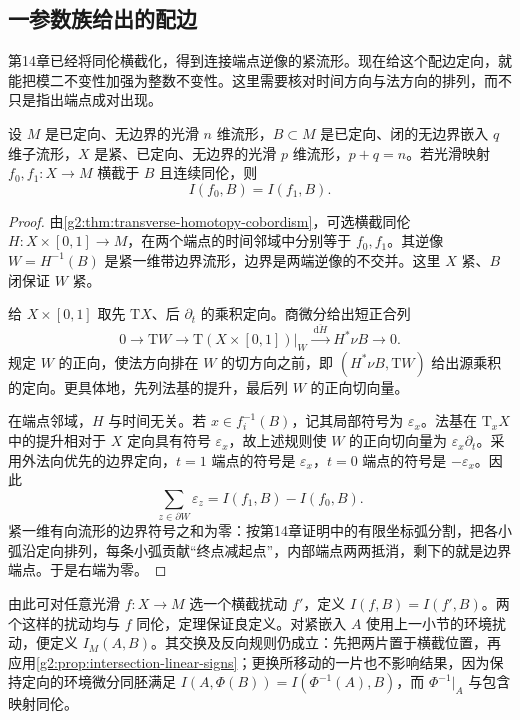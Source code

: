 \subsection{一参数族给出的配边}
\label{g2:subsec:1602:03}

第14章已经将同伦横截化，得到连接端点逆像的紧流形。现在给这个配边定向，就能把模二不变性加强为整数不变性。这里需要核对时间方向与法方向的排列，而不只是指出端点成对出现。

\begin{theorem}\label{g2:thm:intersection-homotopy-invariance}
	设 \(M\) 是已定向、无边界的光滑 \(n\) 维流形，\(B\subset M\) 是已定向、闭的无边界嵌入 \(q\) 维子流形，\(X\) 是紧、已定向、无边界的光滑 \(p\) 维流形，\(p+q=n\)。若光滑映射 \(f_0,f_1:X\to M\) 横截于 \(B\) 且连续同伦，则
	\[
		I(f_0,B)=I(f_1,B).
	\]
\end{theorem}
\begin{proof}
	由\cref{g2:thm:transverse-homotopy-cobordism}，可选横截同伦 \(H:X\times[0,1]\to M\)，在两个端点的时间邻域中分别等于 \(f_0,f_1\)。其逆像 \(W=H^{-1}(B)\) 是紧一维带边界流形，边界是两端逆像的不交并。这里 \(X\) 紧、\(B\) 闭保证 \(W\) 紧。

	给 \(X\times[0,1]\) 取先 \(\mathrm{T}X\)、后 \(\partial_t\) 的乘积定向。商微分给出短正合列
	\[
		0\longrightarrow\mathrm{T}W\longrightarrow\mathrm{T}(X\times[0,1])|_W
		\xrightarrow{\ \overline{\mathrm{d}H}\ }H^*\nu B\longrightarrow0.
	\]
	规定 \(W\) 的正向，使法方向排在 \(W\) 的切方向之前，即 \((H^*\nu B,\mathrm{T}W)\) 给出源乘积的定向。更具体地，先列法基的提升，最后列 \(W\) 的正向切向量。

	在端点邻域，\(H\) 与时间无关。若 \(x\in f_i^{-1}(B)\)，记其局部符号为 \(\varepsilon_x\)。法基在 \(\mathrm{T}_xX\) 中的提升相对于 \(X\) 定向具有符号 \(\varepsilon_x\)，故上述规则使 \(W\) 的正向切向量为 \(\varepsilon_x\partial_t\)。采用外法向优先的边界定向，\(t=1\) 端点的符号是 \(\varepsilon_x\)，\(t=0\) 端点的符号是 \(-\varepsilon_x\)。因此
	\[
		\sum_{z\in\partial W}\varepsilon_z=I(f_1,B)-I(f_0,B).
	\]
	紧一维有向流形的边界符号之和为零：按第14章证明中的有限坐标弧分割，把各小弧沿定向排列，每条小弧贡献“终点减起点”，内部端点两两抵消，剩下的就是边界端点。于是右端为零。
\end{proof}

由此可对任意光滑 \(f:X\to M\) 选一个横截扰动 \(f'\)，定义 \(I(f,B)=I(f',B)\)。两个这样的扰动均与 \(f\) 同伦，定理保证良定义。对紧嵌入 \(A\) 使用上一小节的环境扰动，便定义 \(I_M(A,B)\)。其交换及反向规则仍成立：先把两片置于横截位置，再应用\cref{g2:prop:intersection-linear-signs}；更换所移动的一片也不影响结果，因为保持定向的环境微分同胚满足 \(I(A,\Phi(B))=I(\Phi^{-1}(A),B)\)，而 \(\Phi^{-1}|_A\) 与包含映射同伦。

